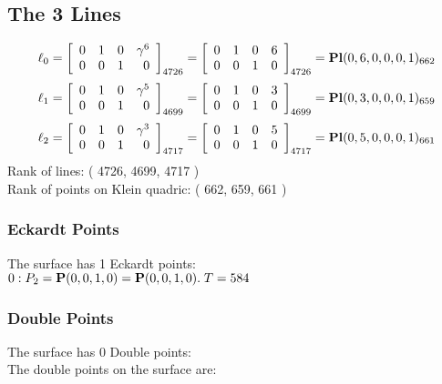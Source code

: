\documentclass{article}
\newcommand{\bP}{{\bf P}}
\begin{document}
{\subsection*{The 3 Lines}
$$
\ell_{0} = 
\left[
\begin{array}{*{4}{r}}
0 & 1 & 0 & \gamma^{6}\\
0 & 0 & 1 & 0\\
\end{array}
\right]
_{4726}
=
\left[
\begin{array}{*{4}c}
0  & 1  & 0  & 6\\
0  & 0  & 1  & 0\\
\end{array}
\right]_{4726}
={\rm\bf Pl}(0,6,0,0,0,1 )_{662}$$
$$
\ell_{1} = 
\left[
\begin{array}{*{4}{r}}
0 & 1 & 0 & \gamma^{5}\\
0 & 0 & 1 & 0\\
\end{array}
\right]
_{4699}
=
\left[
\begin{array}{*{4}c}
0  & 1  & 0  & 3\\
0  & 0  & 1  & 0\\
\end{array}
\right]_{4699}
={\rm\bf Pl}(0,3,0,0,0,1 )_{659}$$
$$
\ell_{2} = 
\left[
\begin{array}{*{4}{r}}
0 & 1 & 0 & \gamma^{3}\\
0 & 0 & 1 & 0\\
\end{array}
\right]
_{4717}
=
\left[
\begin{array}{*{4}c}
0  & 1  & 0  & 5\\
0  & 0  & 1  & 0\\
\end{array}
\right]_{4717}
={\rm\bf Pl}(0,5,0,0,0,1 )_{661}$$
Rank of lines: ( 4726, 4699, 4717 )\\
Rank of points on Klein quadric: ( 662, 659, 661 )\\
\subsubsection*{Eckardt Points}
The surface has 1 Eckardt points:\\
$0 : P_{2}=\bP(0, 0, 1, 0) = \bP(0, 0, 1, 0).\; T= 584$\\
\subsubsection*{Double Points}
The surface has 0 Double points:\\
The double points on the surface are:\\
\begin{multicols}{2}
\noindent
\end{multicols}
}
\end{document}
